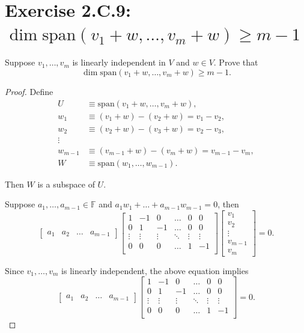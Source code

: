 \section{Exercise 2.C.9: $\dim\text{span}(v_1+w,\dots,v_m+w)\geqslant m-1$}\label{Exercise 2.C.9}
Suppose $v_1,\dots,v_m$ is linearly independent in $V$ and $w\in V$. Prove that\[
\dim\text{span}(v_1+w,\dots,v_m+w)\geqslant m-1.
\]
\begin{proof}
Define\[
\begin{split}
U&\equiv\text{span}(v_1+w,\dots,v_m+w),\\
w_1&\equiv(v_1+w)-(v_2+w)=v_1-v_2,\\
w_2&\equiv(v_2+w)-(v_3+w)=v_2-v_3,\\
\vdots&\\
w_{m-1}&\equiv(v_{m-1}+w)-(v_m+w)=v_{m-1}-v_m,\\
W&\equiv\text{span}(w_1,\dots,w_{m-1}).
\end{split}
\]

Then $W$ is a subspace of $U$.

Suppose $a_1,\dots,a_{m-1}\in\mathbb{F}$ and $a_1w_1+\dots+a_{m-1}w_{m-1}=0$, then\[
\begin{bmatrix}
a_1&a_2&\dots&a_{m-1}
\end{bmatrix}
\begin{bmatrix}
1 & -1 & 0 & \dots & 0 & 0\\
0 & 1 & -1 & \dots & 0 & 0\\
\vdots&\vdots&\vdots&\ddots&\vdots&\vdots\\
0 & 0 & 0 & \dots & 1 & -1\\
\end{bmatrix}
\begin{bmatrix}
v_1\\
v_2\\
\vdots\\
v_{m-1}\\
v_m
\end{bmatrix}
=0.
\]

Since $v_1,\dots,v_m$ is linearly independent, the above equation implies\[
\begin{bmatrix}
a_1&a_2&\dots&a_{m-1}
\end{bmatrix}
\begin{bmatrix}
1 & -1 & 0 & \dots & 0 & 0\\
0 & 1 & -1 & \dots & 0 & 0\\
\vdots&\vdots&\vdots&\ddots&\vdots&\vdots\\
0 & 0 & 0 & \dots & 1 & -1\\
\end{bmatrix}
=0.
\]


\end{proof}
